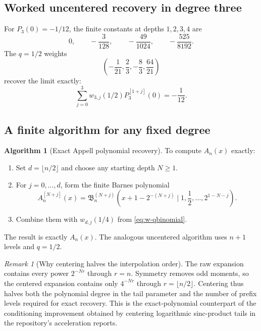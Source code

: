 \documentclass[11pt,oneside]{article}
\theoremstyle{frontier}
\theoremstyle{definition}
\newtheorem{algorithm}[theorem]{Algorithm}
\theoremstyle{remark}
\newtheorem{remark}[theorem]{Remark}
\begin{document}
\subsection{Worked uncentered recovery in degree three}

For $P_3(0)=-1/12$, the finite constants at depths $1,2,3,4$ are
\begin{equation}
 0,
 \qquad -\frac3{128},
 \qquad -\frac{49}{1024},
 \qquad -\frac{525}{8192}.
 \label{eq:P3-prefix-values}
\end{equation}
The $q=1/2$ weights
\begin{equation}
 \left(-\frac1{21},\frac23,-\frac83,\frac{64}{21}\right)
 \label{eq:q12-weights3}
\end{equation}
recover the limit exactly:
\begin{equation}
 \sum_{j=0}^{3}w_{3,j}(1/2)P_3^{[1+j]}(0)=-\frac1{12}.
 \label{eq:P3-exact-example}
\end{equation}

\subsection{A finite algorithm for any fixed degree}

\begin{algorithm}[Exact Appell polynomial recovery]
\label{alg:exact-Appell}
To compute $A_n(x)$ exactly:
\begin{enumerate}
\item Set $d=\lfloor n/2\rfloor$ and choose any starting depth $N\ge1$.
\item For $j=0,\ldots,d$, form the finite Barnes polynomial
\[
 A_n^{[N+j]}(x)
 =\mathfrak B_n^{(N+j)}
 \left(x+1-2^{-(N+j)}\mid1,\frac12,\ldots,2^{1-N-j}\right).
\]
\item Combine them with $w_{d,j}(1/4)$ from \eqref{eq:w-qbinomial}.
\end{enumerate}
The result is exactly $A_n(x)$.  The analogous uncentered algorithm uses $n+1$ levels and
$q=1/2$.
\end{algorithm}

\begin{remark}[Why centering halves the interpolation order]
The raw expansion contains every power $2^{-Nr}$ through $r=n$.  Symmetry removes odd moments,
so the centered expansion contains only $4^{-Nr}$ through $r=\lfloor n/2\rfloor$.  Centering thus
halves both the polynomial degree in the tail parameter and the number of prefix levels required for
exact recovery.  This is the exact-polynomial counterpart of the conditioning improvement obtained
by centering logarithmic sinc-product tails in the repository's acceleration reports.
\end{remark}
\end{document}
